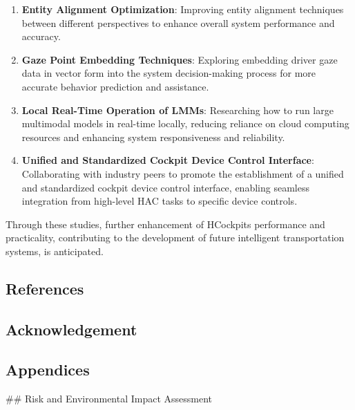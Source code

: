 \documentclass[
]{article}
\begin{document}
\begin{enumerate}
\def\labelenumi{\arabic{enumi}.}
\item
  \textbf{Entity Alignment Optimization}: Improving entity alignment
  techniques between different perspectives to enhance overall system
  performance and accuracy.
\item
  \textbf{Gaze Point Embedding Techniques}: Exploring embedding driver
  gaze data in vector form into the system decision-making process for
  more accurate behavior prediction and assistance.
\item
  \textbf{Local Real-Time Operation of LMMs}: Researching how to run
  large multimodal models in real-time locally, reducing reliance on
  cloud computing resources and enhancing system responsiveness and
  reliability.
\item
  \textbf{Unified and Standardized Cockpit Device Control Interface}:
  Collaborating with industry peers to promote the establishment of a
  unified and standardized cockpit device control interface, enabling
  seamless integration from high-level HAC tasks to specific device
  controls.
\end{enumerate}

Through these studies, further enhancement of HCockpit\textquotesingle s
performance and practicality, contributing to the development of future
intelligent transportation systems, is anticipated.

\subsection{References}\label{references}

\subsection{Acknowledgement}\label{acknowledgement}

\subsection{Appendices}\label{appendices}

\#\# Risk and Environmental Impact Assessment
\end{document}
